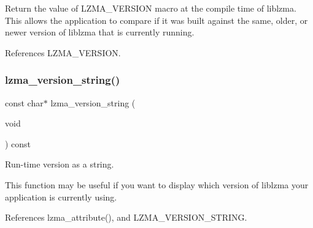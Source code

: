 Return the value of L\+Z\+M\+A\+\_\+\+V\+E\+R\+S\+I\+ON macro at the compile time of liblzma. This allows the application to compare if it was built against the same, older, or newer version of liblzma that is currently running. 

References L\+Z\+M\+A\+\_\+\+V\+E\+R\+S\+I\+ON.

\mbox{\label{version_8h_ac080c58f8b391c7ee14028ce785e76a3}} 
\subsubsection{lzma\+\_\+version\+\_\+string()}
{\footnotesize\ttfamily const char$\ast$ lzma\+\_\+version\+\_\+string (\begin{DoxyParamCaption}\item[{void}]{ }\end{DoxyParamCaption}) const}



Run-\/time version as a string. 

This function may be useful if you want to display which version of liblzma your application is currently using. 

References lzma\+\_\+attribute(), and L\+Z\+M\+A\+\_\+\+V\+E\+R\+S\+I\+O\+N\+\_\+\+S\+T\+R\+I\+NG.

